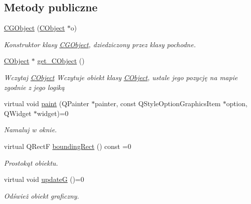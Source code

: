 \subsection*{Metody publiczne}
\begin{DoxyCompactItemize}
\item 
\mbox{\hyperlink{class_c_g_object_a40a7f41342b3b791a8854b3397378d5d}{C\+G\+Object}} (\mbox{\hyperlink{class_c_object}{C\+Object}} $\ast$o)
\begin{DoxyCompactList}\small\item\em Konstruktor klasy \mbox{\hyperlink{class_c_g_object}{C\+G\+Object}}, dziedziczony przez klasy pochodne. \end{DoxyCompactList}\item 
\mbox{\hyperlink{class_c_object}{C\+Object}} $\ast$ \mbox{\hyperlink{class_c_g_object_a711377d1f415ee8f9944fbad886e0ce4}{get\+\_\+\+C\+Object}} ()
\begin{DoxyCompactList}\small\item\em Wczytaj \mbox{\hyperlink{class_c_object}{C\+Object}} Wczytuje obiekt klasy \mbox{\hyperlink{class_c_object}{C\+Object}}, ustale jego pozycję na mapie zgodnie z jego logiką \end{DoxyCompactList}\item 
virtual void \mbox{\hyperlink{class_c_g_object_a9622c313eb09ca5fc0e34f5d2aaac910}{paint}} (Q\+Painter $\ast$painter, const Q\+Style\+Option\+Graphics\+Item $\ast$option, Q\+Widget $\ast$widget)=0
\begin{DoxyCompactList}\small\item\em Namaluj w oknie. \end{DoxyCompactList}\item 
virtual Q\+RectF \mbox{\hyperlink{class_c_g_object_ab9edf3d10a53c254cdb5d3d8de930207}{bounding\+Rect}} () const =0
\begin{DoxyCompactList}\small\item\em Prostokąt obiektu. \end{DoxyCompactList}\item 
virtual void \mbox{\hyperlink{class_c_g_object_a95e80549666e955edd57ab042c2e8ef5}{updateG}} ()=0
\begin{DoxyCompactList}\small\item\em Odśwież obiekt graficzny. \end{DoxyCompactList}\end{DoxyCompactItemize}
